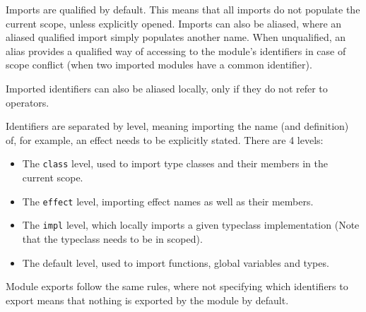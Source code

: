 Imports are qualified by default.
This means that all imports do not populate the current scope, unless explicitly opened.
Imports can also be aliased, where an aliased qualified import simply populates another name.
When unqualified, an alias provides a qualified way of accessing to the module's identifiers in case of scope conflict (when two imported modules have a common identifier).

Imported identifiers can also be aliased locally, only if they do not refer to operators.

Identifiers are separated by level, meaning importing the name (and definition) of, for example, an effect needs to be explicitly stated.
There are 4 levels:
\begin{itemize}
	\item The \verb|class| level, used to import type classes and their members in the current scope.
	\item The \verb|effect| level, importing effect names as well as their members.
	\item The \verb|impl| level, which locally imports a given typeclass implementation (Note that the typeclass needs to be in scoped).
	\item The default level, used to import functions, global variables and types.
\end{itemize}


Module exports follow the same rules, where not specifying which identifiers to export means that nothing is exported by the module by default.



\endgroup
